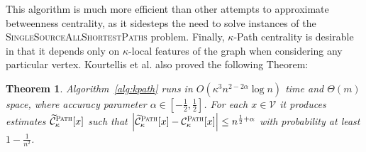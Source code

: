 \documentclass[10]{report}
\newtheorem{theorem}{Theorem}[section]
\newcommand{\push}[1]{\text{push} \left ( #1 \right )}
\newcommand{\pop}{\text{pop}()}
\newcommand{\algoname}[1]{\textnormal{\textsc{#1}}}
\begin{document}
\begin{algorithm}[htbp]
\begin{flushleft}
\begin{algorithmic}[1]
\end{algorithmic}
\end{flushleft}
\end{algorithm}

This algorithm is much more efficient than other attempts to approximate betweenness centrality, as it sidesteps the need to solve instances of the \algoname{SingleSourceAllShortestPaths} problem.
Finally, $\kappa$-Path centrality is desirable in that it depends only on $\kappa$-local features of the graph when considering any particular vertex.
Kourtellis et al. also proved the following Theorem:
%
\begin{theorem} \label{thm:kpath}
Algorithm~\ref{alg:kpath} runs in $O(\kappa^3 n^{2-2\alpha} \log n)$ time and $\Theta(m)$ space, where accuracy parameter 
$\alpha \in \left [ -\frac{1}{2}, \frac{1}{2} \right ]$.
For each $x \in \mathcal{V}$ it produces estimates $\widetilde{\mathcal{C}}_\kappa^{\algoname{Path}}[x]$ such that 
$\left | \widetilde{\mathcal{C}}_\kappa^{\algoname{Path}}[x] - \mathcal{C}_\kappa^{\algoname{Path}}[x] \right | \leq n^{\frac{1}{2} + \alpha}$ with probability at least $1 - \frac{1}{n^2}$.
\end{theorem}
\end{document}
